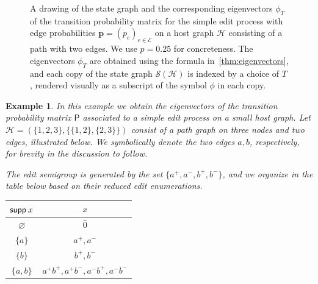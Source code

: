 \documentclass[11pt,a4paper]{article}
\newcommand{\supp}{{\mathsf{supp }\hspace{.075cm}}}
\newtheorem{example}[theorem]{Example}
\begin{document}
\begin{figure}
\begin{center}
    \caption{A drawing of the state graph and the corresponding eigenvectors $\phi_T$ of the transition probability matrix for the simple edit process with edge probabilities $\mathbf{p} = (p_e)_{e\in\mathcal{E}}$ on a host graph $\mathcal{H}$ consisting of a path with two edges. We use $p=0.25$ for concreteness. The eigenvectors $\phi_T$ are obtained using the formula in~\cref{thm:eigenvectors}, and each copy of the state graph $\mathscr{S}(\mathcal{H})$ is indexed by a choice of $T$, rendered visually as a subscript of the symbol $\phi$ in each copy.}\label{fig:baby-monster}
    \end{center}
\end{figure}

\begin{example}\normalfont\label{ex:path-on-two-edges}
    In this example we obtain the eigenvectors of the transition probability matrix $\mathsf{P}$ associated to a simple edit process on a small host graph. Let $\mathcal{H} = (\{1, 2, 3\}, \{\{1, 2\}, \{2, 3\}\})$ consist of a path graph on three nodes and two edges, illustrated below. We symbolically denote the two edges $a, b$, respectively, for brevity in the discussion to follow.

    \begin{center}
    \end{center}

    The edit semigroup is generated by the set $\{{a^+}, {a^-}, {b^+}, {b^-}\}$, and we organize in the table below based on their reduced edit enumerations.

    \begin{center}
        \begin{tabular}{c|c}
            $\supp{x} $ & $x$ \\\hline\hline
            $\varnothing$ & $\widehat{0}$\\
            $\{a\}$ & ${a^+}, {a^-}$\\
            $\{b\}$ & ${b^+}, {b^-}$\\
            $\{a, b\}$ & ${a^+}{b^+}, {a^+}{b^-}, {a^-}{b^+}, {a^-}{b^-}$
        \end{tabular}
    \end{center}


\end{example}
\end{document}
